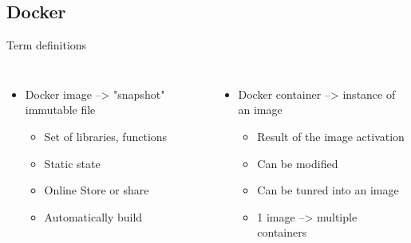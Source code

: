 \subsection{Docker}{Term definitions}
\begin{frame}
\begin{columns}
\begin{itemize}
\item Docker image --> "snapshot" immutable file
	\begin{itemize}
	\item Set of libraries, functions
	\item Static state
	\item Online Store or share
	\item Automatically build
	\end{itemize}
\end{itemize}
\begin{itemize}
\item Docker container --> instance of an image
	\begin{itemize}
	\item Result of the image activation
	\item Can be modified
	\item Can be tunred into an image
	\item 1 image --> multiple containers 
	\end{itemize}
\end{itemize} 
\end{columns}
\end{frame}

